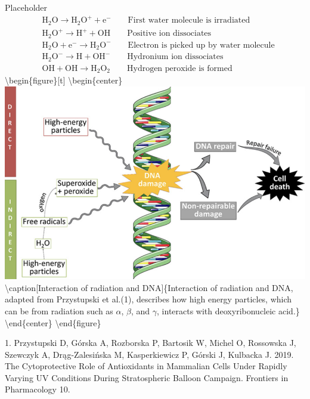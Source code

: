 \documentclass[12pt,twoside]{reedthesis}
\begin{document}
Placeholder
\begin{align*} 
  &\mathrm{H_{2}O} \longrightarrow \mathrm{H_{2}O^{+} + e^-}   \qquad \text{First water molecule is irradiated} \\
  &\mathrm{H_{2}O^+} \longrightarrow \mathrm{H^{+} + OH}       \qquad \text{Positive ion dissociates} \\
  &\mathrm{H_{2}O + e^-} \longrightarrow \mathrm{H_{2}O^-}     \qquad \text{Electron is picked up by water molecule} \\
  &\mathrm{H_{2}O^-} \longrightarrow \mathrm{H + OH^-}         \qquad \text{Hydronium ion dissociates} \\
  &\mathrm{OH + OH} \longrightarrow \mathrm{H_{2}O_{2}}        \qquad \text{Hydrogen peroxide is formed} 
  \label{eq:reaction}
\end{align*}
\textbackslash begin\{figure\}{[}t{]}
\textbackslash begin\{center\}
\includegraphics[width=\textwidth]{figure/radiation_DNA.png}
\textbackslash caption{[}Interaction of radiation and DNA{]}\{Interaction of radiation and DNA, adapted from Przystupski et al.(1), describes how high energy particles, which can be from radiation such as \(\alpha\), \(\beta\), and \(\gamma\), interacts with deoxyribonucleic acid.\}
\label{fig:radiationDNA}
\textbackslash end\{center\}
\textbackslash end\{figure\}

\hypertarget{refs}{}
\leavevmode\hypertarget{ref-przystupski_cytoprotective_2019}{}%
1. Przystupski D, Górska A, Rozborska P, Bartosik W, Michel O, Rossowska J, Szewczyk A, Drąg-Zalesińska M, Kasperkiewicz P, Górski J, Kulbacka J. 2019. The Cytoprotective Role of Antioxidants in Mammalian Cells Under Rapidly Varying UV Conditions During Stratospheric Balloon Campaign. Frontiers in Pharmacology 10.


\end{document}
